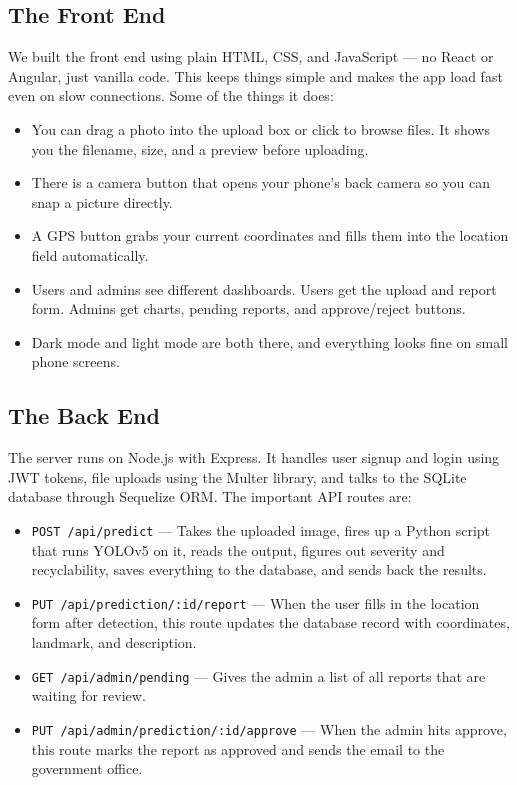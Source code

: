 \documentclass[conference]{IEEEtran}
\begin{document}
\subsection{The Front End}
We built the front end using plain HTML, CSS, and JavaScript — no React or Angular, just vanilla code. This keeps things simple and makes the app load fast even on slow connections. Some of the things it does:

\begin{itemize}[leftmargin=*]
    \item You can drag a photo into the upload box or click to browse files. It shows you the filename, size, and a preview before uploading.
    \item There is a camera button that opens your phone's back camera so you can snap a picture directly.
    \item A GPS button grabs your current coordinates and fills them into the location field automatically.
    \item Users and admins see different dashboards. Users get the upload and report form. Admins get charts, pending reports, and approve/reject buttons.
    \item Dark mode and light mode are both there, and everything looks fine on small phone screens.
\end{itemize}

\subsection{The Back End}
The server runs on Node.js with Express. It handles user signup and login using JWT tokens, file uploads using the Multer library, and talks to the SQLite database through Sequelize ORM. The important API routes are:

\begin{itemize}[leftmargin=*]
    \item \texttt{POST /api/predict} — Takes the uploaded image, fires up a Python script that runs YOLOv5 on it, reads the output, figures out severity and recyclability, saves everything to the database, and sends back the results.
    \item \texttt{PUT /api/prediction/:id/report} — When the user fills in the location form after detection, this route updates the database record with coordinates, landmark, and description.
    \item \texttt{GET /api/admin/pending} — Gives the admin a list of all reports that are waiting for review.
    \item \texttt{PUT /api/admin/prediction/:id/approve} — When the admin hits approve, this route marks the report as approved and sends the email to the government office.
\end{itemize}
\end{document}

